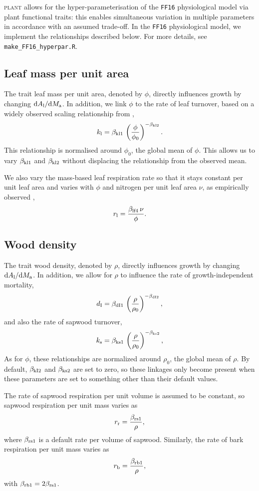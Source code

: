 \documentclass[10pt,twoside]{article}
\newcommand{\plant}{\textsc{plant}}
\begin{document}
{\plant} allows for the
hyper-parameterisation of the \texttt{FF16} physiological model via plant functional traits: this enables
simultaneous variation in multiple parameters in accordance with an assumed trade-off. In the
\texttt{FF16} physiological model, we implement the relationships described below. For more
details, see \texttt{make\_FF16\_hyperpar.R}.

\subsection{Leaf mass per unit area}

The trait leaf mass per unit area, denoted by $\phi$, directly influences growth by changing
${\rm d}A_{\rm l} / {\rm d}M_{\rm a}$. In addition, we
link $\phi$ to the rate of leaf turnover,
based on a widely observed scaling relationship from \citet{Wright-2004},
$$k_{\rm l} = \beta_{{\rm kl1}} \, \left(\frac{\phi}{\phi_0}\right)^{-\beta_{{\rm kl2}}}.$$
This relationship is normalised around $\phi_0$, the global mean of $\phi$. This
allows us to vary $\beta_{{\rm kl1}}$ and $\beta_{{\rm kl2}}$ without displacing the relationship from the
observed mean.

We also vary the mass-based leaf respiration rate so that it stays constant per unit leaf area and
varies with $\phi$ and nitrogen per unit leaf area $\nu$, as empirically observed \cite{Wright-2004},
$$r_{\rm l} = \frac{\beta_{{\rm lf4}}\, \nu}{\phi}.$$

\subsection{Wood density}

The trait wood density, denoted by $\rho$, directly influences growth by changing
${\rm d}A_{\rm l} / {\rm d}M_{\rm a}$. In addition, we allow for
$\rho$ to influence the rate of growth-independent mortality,
$$d_{\rm I} = \beta_{{\rm dI1}} \, \left(\frac{\rho}{\rho_0}\right) ^ {-\beta_{{\rm dI2}}},$$
and also the rate of sapwood turnover,
$$k_{\rm s} = \beta_{{\rm ks1}} \, \left(\frac{\rho}{\rho_0}\right)^ {-\beta_{{\rm ks2}}},$$
As for $\phi$, these relationships are normalized around $\rho_0$, the global mean of $\rho$.
By default, $\beta_{{\rm kI2}}$ and $\beta_{{\rm ks2}}$ are set to zero, so these linkages
only become present when these parameters are set to something other than their default values.

The rate of sapwood respiration per unit volume is assumed to be constant, so
sapwood respiration per unit mass varies as
$$r_{\rm r}  = \frac{\beta_{{\rm rs1}}}{\rho},$$
where $\beta_{{\rm rs1}}$ is a default rate per volume of sapwood.
Similarly, the rate of bark respiration per unit mass varies as
$$r_{\rm b} = \frac{\beta_{{\rm rb1}}}{\rho},$$
with $\beta_{{\rm rb1}} = 2 \beta_{{\rm rs1}}$.
\end{document}
